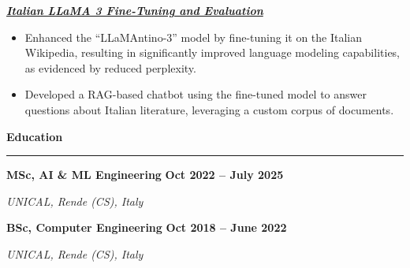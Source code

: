 \documentclass[9pt, a4paper]{article}
\newcommand{\cvsection}[1]{%
	\vspace{2pt}\par
	{\Large\bfseries\color{sectionblue}#1}\par
	\vspace{2pt}\hrule\vspace{6pt}
}
\newcommand{\cvsubsection}[3]{%
	\par {\large\bfseries #1} \hfill {\bfseries #2} \par {\textit{#3}} \vspace{4pt}
}
\newcommand{\cvproject}[1]{%
	\par {\large{\bfseries{\textit{#1}}}} \par \vspace{4pt}
}
\begin{document}
\begin{minipage}[t]{0.65\linewidth}
		\vspace{6pt}
		\cvproject{\href{https://github.com/bGuzzo/Italian-LLaMA-Project}{Italian LLaMA 3 Fine-Tuning and Evaluation}}
		\begin{itemize}[leftmargin=*, nosep]
			\item \footnotesize Enhanced the ``LLaMAntino-3'' model by fine-tuning it on the Italian Wikipedia, resulting in significantly improved language modeling capabilities, as evidenced by reduced perplexity.
			
			\vspace{2pt}
			\item \footnotesize Developed a RAG-based chatbot using the fine-tuned model to answer questions about Italian literature, leveraging a custom corpus of documents.
		\end{itemize}
		
		\vspace{10pt}\par
		\cvsection{Education}
		
		\cvsubsection{MSc, AI \& ML Engineering}{Oct 2022 -- July 2025}{UNICAL, Rende (CS), Italy}
		\cvsubsection{BSc, Computer Engineering}{Oct 2018 -- June 2022}{UNICAL, Rende (CS), Italy}
		
	\end{minipage}%
	\hfill%
\end{document}
